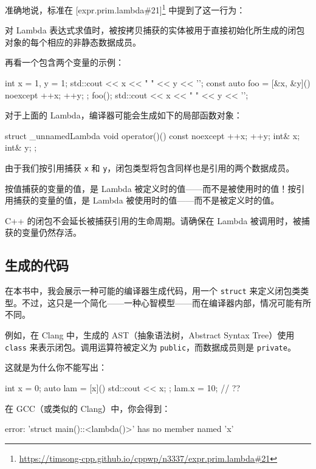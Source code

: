 \begin{codebox}
准确地说，标准在 [expr.prim.lambda\#21]\footnote{\url{https://timsong-cpp.github.io/cppwp/n3337/expr.prim.lambda\#21}} 中提到了这一行为：

对 Lambda 表达式求值时，被按拷贝捕获的实体被用于直接初始化所生成的闭包对象的每个相应的非静态数据成员。

再看一个包含两个变量的示例：

\begin{codebox}
int x = 1, y = 1;
std::cout << x << " " << y << '\n';
const auto foo = [&x, &y]() noexcept { ++x; ++y; };
foo();
std::cout << x << " " << y << '\n';
\end{codebox}

对于上面的 Lambda，编译器可能会生成如下的局部函数对象：

\begin{codebox}
struct _unnamedLambda {
void operator()() const noexcept {
++x; ++y;
}
int& x;
int& y;
};
\end{codebox}

由于我们按引用捕获 \texttt{x} 和 \texttt{y}，闭包类型将包含同样也是引用的两个数据成员。


按值捕获的变量的值，是 Lambda 被定义时的值——而不是被使用时的值！按引用捕获的变量的值，是 Lambda 被使用时的值——而不是被定义时的值。

C++ 的闭包不会延长被捕获引用的生命周期。请确保在 Lambda 被调用时，被捕获的变量仍然存活。

\subsection{生成的代码}

在本书中，我会展示一种可能的编译器生成代码，用一个 \texttt{struct} 来定义闭包类类型。不过，这只是一个简化——一种心智模型——而在编译器内部，情况可能有所不同。

例如，在 Clang 中，生成的 AST（抽象语法树，Abstract Syntax Tree）使用 \texttt{class} 来表示闭包。调用运算符被定义为 \texttt{public}，而数据成员则是 \texttt{private}。

这就是为什么你不能写出：

\begin{codebox}
int x = 0;
auto lam = [x]() { std::cout << x; };
lam.x = 10; // ??
\end{codebox}

在 GCC（或类似的 Clang）中，你会得到：

\begin{codebox}
error: 'struct main()::<lambda()>' has no member named 'x'
\end{codebox}


\end{codebox}
